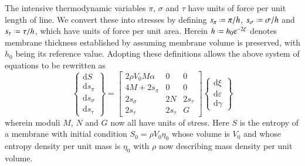 The intensive thermo\-dynamic variables $\pi$, $\sigma$ and $\tau$ have units of force per unit length of line.  We convert these into stresses by defining $s_{\pi} \defeq \pi / h$, $s_{\sigma} \defeq \sigma / h$ and $s_{\tau} \defeq \tau / h$, which have units of force per unit area.  Herein $h \defeq h_0 \mathrm{e}^{-2\xi}$ denotes membrane thickness established by assuming membrane volume is preserved, with $h_0$ being its reference value.  Adopting these definitions allows the above system of equations to be rewritten as
\begin{equation}
\left\{ \begin{matrix}
\mathrm{d} S \\ \mathrm{d} s_{\pi} \\ 
\mathrm{d} s_{\sigma} \\ \mathrm{d} s_{\tau}
\end{matrix} \right\} = \begin{bmatrix}
2 \rho V_0 M \alpha & 0 & 0 \\
4 M + 2 s_{\pi} & 0 & 0 \\
2 s_{\sigma} & 2 N & 2 s_{\tau} \\
2 s_{\tau} & 2 s_{\tau} & G
\end{bmatrix} \left\{ \begin{matrix}
\mathrm{d} \xi \\ \mathrm{d} \varepsilon \\ \mathrm{d} \gamma
\end{matrix} \right\}
\end{equation}
wherein moduli $M$, $N$ and $G$ now all have units of stress.  Here $S$ is the entropy of a membrane with initial condition $S_0 = \rho V_0 \eta_0$ whose volume is $V_0$ and whose entropy density per unit mass is $\eta_0$ with $\rho$ now describing mass density per unit volume.

